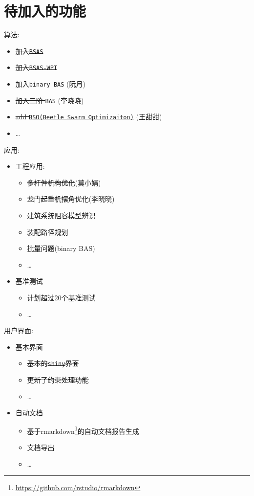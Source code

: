 \documentclass[]{ctexbook}
\providecommand{\tightlist}{%
  \setlength{\itemsep}{0pt}\setlength{\parskip}{0pt}}
\renewcommand{\href}[2]{#2\footnote{\url{#1}}}
\theoremstyle{definition}
\theoremstyle{definition}
\theoremstyle{definition}
\theoremstyle{remark}
\begin{document}
\section{待加入的功能}

算法:

\begin{itemize}
\tightlist
\item
  \sout{加入\texttt{BSAS}}
\item
  \sout{加入\texttt{BSAS-WPT}}
\item
  加入\texttt{binary\ BAS} (阮月)
\item
  \sout{加入二阶 \texttt{BAS}} (李晓晓)
\item
  \sout{add \texttt{BSO(Beetle\ Swarm\ Optimizaiton)}} (王甜甜)
\item
  \ldots{}
\end{itemize}

应用:

\begin{itemize}
\tightlist
\item
  工程应用:

  \begin{itemize}
  \tightlist
  \item
    \sout{多杆件机构优化}(莫小娟)
  \item
    \sout{龙门起重机摆角优化}(李晓晓)
  \item
    建筑系统阻容模型辨识
  \item
    装配路径规划
  \item
    批量问题(binary BAS)
  \item
    \ldots{}
  \end{itemize}
\item
  基准测试

  \begin{itemize}
  \tightlist
  \item
    计划超过20个基准测试
  \item
    \ldots{}
  \end{itemize}
\end{itemize}

用户界面:

\begin{itemize}
\tightlist
\item
  基本界面

  \begin{itemize}
  \tightlist
  \item
    \sout{基本的\texttt{shiny}界面}
  \item
    \sout{更新了约束处理功能}
  \item
    \ldots{}
  \end{itemize}
\item
  自动文档

  \begin{itemize}
  \tightlist
  \item
    基于\href{https://github.com/rstudio/rmarkdown}{rmarkdown}的自动文档报告生成
  \item
    文档导出
  \item
    \ldots{}
  \end{itemize}
\end{itemize}
\end{document}
